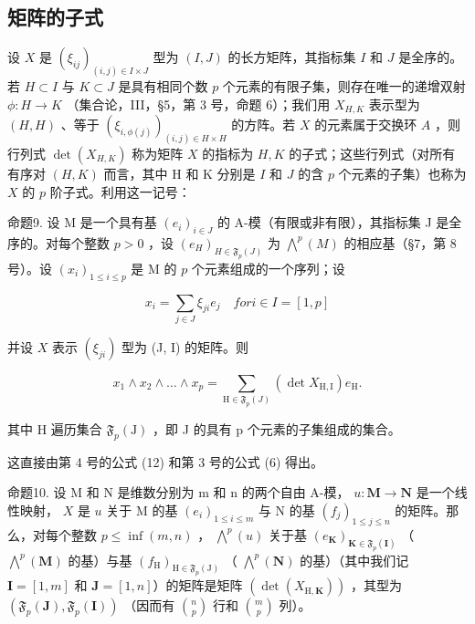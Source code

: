 \subsection{矩阵的子式}

设 \(X\) 是 \((\xi_{ij})_{(i,j)\in I\times J}\) 型为 \((I,J)\) 的长方矩阵，其指标集 \(I\) 和 \(J\) 是全序的。若 \(H\subset I\) 与 \(K\subset J\) 是具有相同个数 \(p\) 个元素的有限子集，则存在唯一的递增双射 \(\phi :H\to K\) （集合论，III，§5，第 3 号，命题 6）；我们用 \(X_{H,K}\) 表示型为 \((H,H)\) 、等于 \((\xi_{i,\phi (j)})_{(i,j)\in H\times H}\) 的方阵。若 \(X\) 的元素属于交换环 \(A\) ，则行列式 \(\det (X_{H,K})\) 称为矩阵 \(X\) 的指标为 \(H,K\) 的子式；这些行列式（对所有有序对 \((H,K)\) 而言，其中 H 和 K 分别是 \(I\) 和 \(J\) 的含 \(p\) 个元素的子集）也称为 \(X\) 的 \(p\) 阶子式。利用这一记号：

命题9. 设 M 是一个具有基 \((e_i)_{i \in J}\) 的 A-模（有限或非有限），其指标集 J 是全序的。对每个整数 \(p > 0\) ，设 \((e_H)_{H \in \mathfrak{F}_p(J)}\) 为 \(\bigwedge^p(M)\) 的相应基（§7，第 8 号）。设 \((x_i)_{1 \leqslant i \leqslant p}\) 是 M 的 \(p\) 个元素组成的一个序列；设

\[
x _ {i} = \sum_ {j \in J} \xi_ {j i} e _ {j} \quad for i \in I = [1, p]
\]

并设 \(X\) 表示 \((\xi_{ji})\) 型为 (J, I) 的矩阵。则

\[
x _ {1} \wedge x _ {2} \wedge \dots \wedge x _ {p} = \sum_ {\mathrm{H} \in \mathfrak {F} _ {p} (J)} (\det X _ {\mathrm{H,I}}) e _ {\mathrm{H}}.\tag{17}
\]

其中 H 遍历集合 \(\mathfrak{F}_{p}(\mathrm{J})\) ，即 J 的具有 p 个元素的子集组成的集合。

这直接由第 4 号的公式 (12) 和第 3 号的公式 (6) 得出。

命题10. 设 M 和 N 是维数分别为 m 和 n 的两个自由 A-模， \(u: \mathbf{M} \to \mathbf{N}\) 是一个线性映射， \(X\) 是 \(u\) 关于 M 的基 \((e_i)_{1 \leqslant i \leqslant m}\) 与 N 的基 \((f_j)_{1 \leqslant j \leqslant n}\) 的矩阵。那么，对每个整数 \(p \leqslant \inf(m, n)\) ， \(\bigwedge^p(u)\) 关于基 \((e_{\mathbf{K}})_{\mathbf{K} \in \mathfrak{F}_p(\mathbf{I})}\) （ \(\bigwedge^p(\mathbf{M})\) 的基）与基 \((f_{\mathrm{H}})_{\mathrm{H} \in \mathfrak{F}_p(\mathrm{J})}\) （ \(\bigwedge^p(\mathbf{N})\) 的基）（其中我们记 \(\mathbf{I} = [1, m]\) 和 \(\mathbf{J} = [1, n]\)）的矩阵是矩阵 \((\det(X_{\mathrm{H},\mathbf{K}}))\) ，其型为 \((\mathfrak{F}_p(\mathbf{J}), \mathfrak{F}_p(\mathbf{I}))\) （因而有 \(\binom{n}{p}\) 行和 \(\binom{m}{p}\) 列）。

